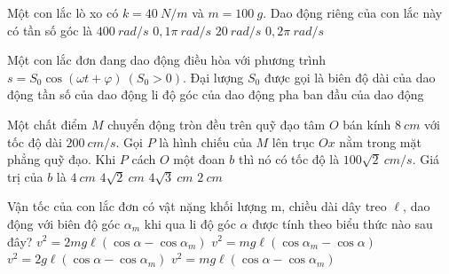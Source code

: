 	\begin{ex} %
		Một con lắc lò xo có $k = 40\ N/m$ và $m = 100\ g$. Dao động riêng của con lắc này có tần số góc là
		\choice
		{$400\ rad/s$}
		{$0,1\pi\ rad/s$}
		{\True $20\ rad/s$}
		{$0,2\pi\ rad/s$}
		
	\end{ex}
	\begin{ex}%
		
	\end{ex}
	
	
	
	\begin{ex}
		Một con lắc đơn đang dao động điều hòa với phương trình $s = S_0\cos(\omega t + \varphi)\ (S_0> 0)$. Đại lượng $S_0$ được gọi là
		\choice
		{\True biên độ dài của dao động}			
		{tần số của dao động}
		{li độ góc của dao động}
		{pha ban đầu của dao động}
	\end{ex}
	\begin{ex}%
		Một chất điểm $M$ chuyển động tròn đều trên quỹ đạo tâm $O$ bán kính $8\ cm$ với tốc độ dài $200\ cm/s$. Gọi $P$ là hình chiếu của $M$ lên trục $Ox$ nằm trong mặt phẳng quỹ đạo. Khi $P$ cách $O$ một đoan $b$ thì nó có tốc độ là $100 \sqrt{2} \ cm/s$. Giá trị của $b$ là
		\choice
		{$4\ cm$}
		{\True $4 \sqrt{2} \ cm$}
		{$4 \sqrt{3} \ cm$}
		{$2\ cm$}
		\loigiai{
		}
		
	\end{ex}
	\begin{ex}%
		Vận tốc của con lắc đơn có vật nặng khối lượng m, chiều dài dây treo $\ell$, dao động với biên độ góc $\alpha _m$ khi qua li độ góc $\alpha $ được tính theo biểu thức nào sau đây?
		\choice
		{$v^2=2mg\ell\left({\cos\alpha - \cos\alpha _m}\right)$}
		{$v^2=mg\ell\left({\cos\alpha _m-\cos\alpha }\right)$}
		{\True $v^2=2g\ell\left({\cos\alpha -\cos\alpha _m}\right)$}
		{$v^2=mg\ell\left({\cos\alpha - \cos\alpha _m}\right)$}
		\loigiai{
			Vận tốc của con lắc đơn $v^2=2g\ell\left({\cos \alpha -\cos \alpha _m}\right)$.
		}
	\end{ex}
	
